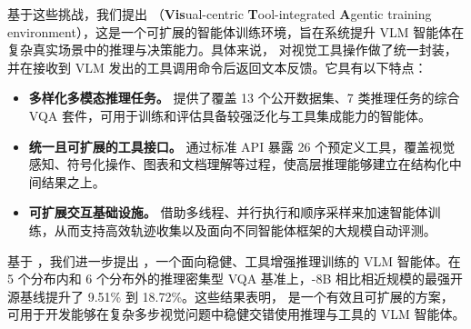 基于这些挑战，我们提出 \env{}（\textbf{Vis}ual-centric \textbf{T}ool-integrated \textbf{A}gentic training environment），这是一个可扩展的智能体训练环境，旨在系统提升 VLM 智能体在复杂真实场景中的推理与决策能力。具体来说，\env{} 对视觉工具操作做了统一封装，并在接收到 VLM 发出的工具调用命令后返回文本反馈。它具有以下特点：
\begin{itemize}[leftmargin=*,noitemsep,topsep=2pt]
    \item \textbf{多样化多模态推理任务。} \env{} 提供了覆盖 13 个公开数据集、7 类推理任务的综合 VQA 套件，可用于训练和评估具备较强泛化与工具集成能力的智能体。
    \item \textbf{统一且可扩展的工具接口。} \env{} 通过标准 API 暴露 26 个预定义工具，覆盖视觉感知、符号化操作、图表和文档理解等过程，使高层推理能够建立在结构化中间结果之上。
    \item \textbf{可扩展交互基础设施。} \env{} 借助多线程、并行执行和顺序采样来加速智能体训练，从而支持高效轨迹收集以及面向不同智能体框架的大规模自动评测。
\end{itemize}

基于 \env{}，我们进一步提出 \ours{}，一个面向稳健、工具增强推理训练的 VLM 智能体。在 5 个分布内和 6 个分布外的推理密集型 VQA 基准上，\ours{}-8B 相比相近规模的最强开源基线提升了 9.51\% 到 18.72\%。这些结果表明，\env{} 是一个有效且可扩展的方案，可用于开发能够在复杂多步视觉问题中稳健交错使用推理与工具的 VLM 智能体。
